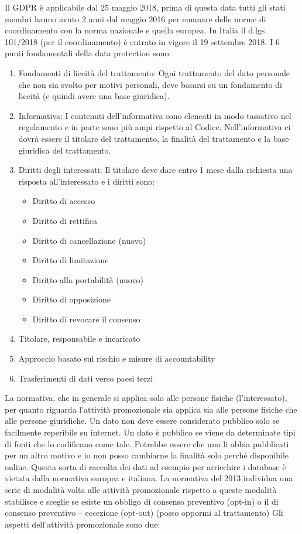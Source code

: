 \documentclass[a4page, 11pt, twocolumn]{article}
\begin{document}
Il GDPR è applicabile dal 25 maggio 2018, prima di questa data tutti gli stati membri hanno avuto 2 anni dal maggio 2016 per emanare delle norme di coordinamento con la norma nazionale e quella europea. In Italia il d.lgs. 101/2018 (per il coordinamento) è entrato in vigore il 19 settembre 2018. 
I 6 punti fondamentali della data protection sono:
\begin{enumerate}
  \item Fondamenti di liceità del trattamento: Ogni trattamento del dato personale che non sia svolto per motivi personali, deve basarsi su un fondamento di liceità (e quindi avere una base giuridica).
  \item Informativa: I contenuti dell’informativa sono elencati in modo tassativo nel regolamento e in parte sono più ampi rispetto al Codice. Nell’informativa ci dovrà essere il titolare del trattamento, la finalità del trattamento e la base giuridica del trattamento.
  \item Diritti degli interessati: Il titolare deve dare entro 1 mese dalla richiesta una risposta all’interessato e i diritti sono:
  \begin{itemize}
    \item Diritto di accesso
    \item Diritto di rettifica
    \item Diritto di cancellazione (nuovo)
    \item Diritto di limitazione
    \item Diritto alla portabilità (nuovo)
    \item Diritto di opposizione
    \item Diritto di revocare il consenso
  \end{itemize}
  \item Titolare, responsabile e incaricato
  \item Approccio basato sul rischio e misure di accountability
  \item Trasferimenti di dati verso paesi terzi
\end{enumerate}

La normativa, che in generale si applica solo alle persone fisiche (l’interessato), per quanto riguarda l’attività promozionale sia applica sia alle persone fisiche che alle persone giuridiche. Un dato non deve essere considerato pubblico solo se facilmente reperibile su internet. Un dato è pubblico se viene da determinate tipi di fonti che lo codificano come tale. Potrebbe essere che uno li abbia pubblicati per un altro motivo e io non posso cambiarne la finalità solo perché disponibile online. Questa sorta di raccolta dei dati ad esempio per arricchire i database è vietata dalla normativa europea e italiana. La normativa del 2013 individua una serie di modalità volta alle attività promozionale rispetto a queste modalità stabilisce e sceglie se esiste un obbligo di consenso preventivo (opt-in) o il di consenso preventivo – eccezione (opt-out) (posso oppormi al trattamento) 
Gli aspetti dell’attività promozionale sono due: 
\end{document}
